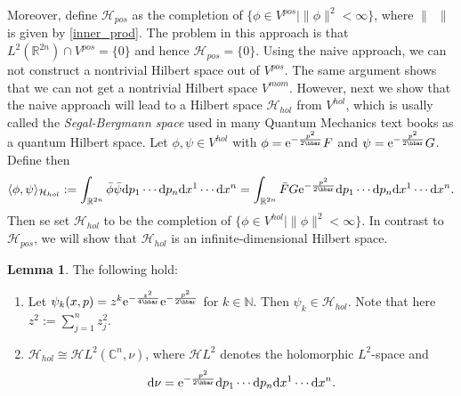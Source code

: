 \documentclass[12pt]{amsart}
\numberwithin{equation}{section}
\theoremstyle{plain}
\theoremstyle{definition}
\newtheorem{lem}{Lemma}[subsection]
\theoremstyle{remark}
\newcommand{\R}{\mathbb{R}}
\newcommand{\N}{\mathbb{N}}
\newcommand{\dd}{{\mathrm{d}}}
\newcommand{\calH}{\mathcal{H}}
\newcommand{\ee}{\textnormal{e}}
\begin{document}
Moreover, define $\calH_{pos}$ as the completion of $\{\phi\in V^{pos}\mid \|\phi\|^2<\infty\}$, where $\|\enspace\|$ is given by \eqref{inner_prod}. The problem in this approach is that $L^2(\R^{2n})\cap V^{pos}=\{0\}$ and hence $\calH_{pos}=\{0\}$. Using the naive approach, we can not construct a nontrivial Hilbert space out of $V^{pos}$. The same argument shows that we can not get a nontrivial Hilbert space $V^{mom}$. However, next we show that the naive approach will lead to a Hilbert space $\calH_{hol}$ from $V^{hol}$, which is usally called the \emph{Segal-Bergmann space} used in many Quantum Mechanics text books as a quantum Hilbert space. Let $\phi,\psi\in V^{hol}$ with $\phi=\ee^{-\frac{p^2}{2\hbar}}F$ and $\psi=\ee^{-\frac{p^2}{2\hbar}}G$. Define then $$\langle\phi,\psi\rangle_{\calH_{hol}}:=\int_{\R^{2n}}\bar\phi\bar\psi\dd p_1\dotsm\dd p_n\dd x^{1}\dotsm\dd x^n=\int_{\R^{2n}}\bar F G\ee^{-\frac{p^2}{2\hbar}}\dd p_1\dotsm\dd p_n\dd x^{1}\dotsm\dd x^n.$$
Then se set $\calH_{hol}$ to be the completion of $\{\phi\in V^{hol}\mid \| \phi\|^2<\infty\}$. In contrast to $\calH_{pos}$, we will show that $\calH_{hol}$ is an infinite-dimensional Hilbert space.

\begin{lem}
The following hold:
\begin{enumerate}
\item{Let $\psi_k(x,p)=z^k\ee^{-\frac{z^2}{4\hbar}}\ee^{-\frac{p^2}{2\hbar}}$ for $k\in\N$. Then $\psi_k\in\calH_{hol}$. Note that here $z^2:=\sum_{j=1}^nz_j^2$.
}
\item{$\calH_{hol}\cong \mathscr{H}L^2(\mathbb{C}^n,\nu)$, where $\mathscr{H}L^2$ denotes the holomorphic $L^2$-space and $$\dd\nu=\ee^{-\frac{p^2}{2\hbar}}\dd p_1\dotsm\dd p_n\dd x^{1}\dotsm\dd x^n.$$
}
\end{enumerate}
\end{lem}
\end{document}
